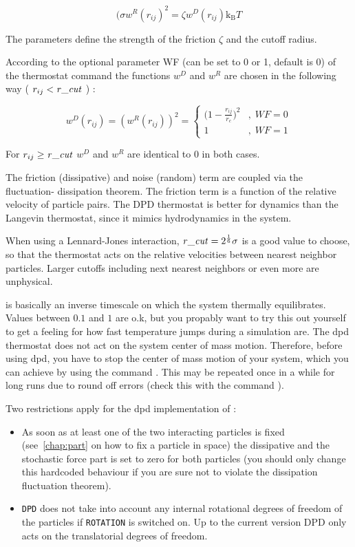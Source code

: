 $$ (\sigma w^R (r_{ij})^2=\zeta w^D (r_{ij}) \text{k}_\text{B} T $$

The parameters   define the strength of the
friction $\zeta$ and the cutoff radius.

According to the optional parameter WF (can be set to 0 or 1, default
is 0) of the thermostat command the functions $w^D$ and $w^R$ are
chosen in the following way ( $ r_{ij} < \mathrm{\mathit{r\_cut}} $ ) :

$$ 
w^D (r_{ij}) = ( w^R (r_{ij})) ^2 = 
   \left\{
   \begin{array}{clcr} 
             {( 1 - \frac{r_{ij}}{r_c}} )^2 & , \; WF = 0 \\
             1                      & , \; WF = 1
   \end{array}
   \right.
$$

For $ r_{ij} \ge \mathrm{\mathit{r\_cut}} $  $w^D$ and $w^R$ are identical to 0 in both cases.

The friction (dissipative) and noise (random) term are coupled via the
fluctuation- dissipation theorem. The friction term is a function of
the relative velocity of particle pairs.  The DPD thermostat is better
for dynamics than the Langevin thermostat, since it mimics
hydrodynamics in the system.

When using a Lennard-Jones interaction, $\mathrm{\mathit{r\_cut}} =
2^{\frac{1}{6}} \sigma$ is a good value to choose, so that the
thermostat acts on the relative velocities between nearest neighbor
particles.  Larger cutoffs including next nearest neighbors or even
more are unphysical.

 is basically an inverse timescale on which the system
thermally equilibrates.  Values between $0.1$ and $1$ are o.k, but you
propably want to try this out yourself to get a feeling for how fast
temperature jumps during a simulation are. The dpd thermostat does not
act on the system center of mass motion.  Therefore, before using dpd,
you have to stop the center of mass motion of your system, which you
can achieve by using the command .
 This may be
repeated once in a while for long runs due to round off errors (check
this with the command ).  

Two restrictions apply for the dpd implementation of \es:

\begin{itemize}
\item As soon as at least one of the two interacting particles is
  fixed (see~\ref{chap:part} on how to fix a particle in space) the
  dissipative and the stochastic force part is set to zero for both
  particles (you should only change this hardcoded behaviour if you
  are sure not to violate the dissipation fluctuation theorem).
\item \texttt{DPD} does not take into account any internal rotational
  degrees of freedom of the particles if \texttt{ROTATION} is switched
  on. Up to the current version DPD only acts on the translatorial
  degrees of freedom.
\end{itemize}

